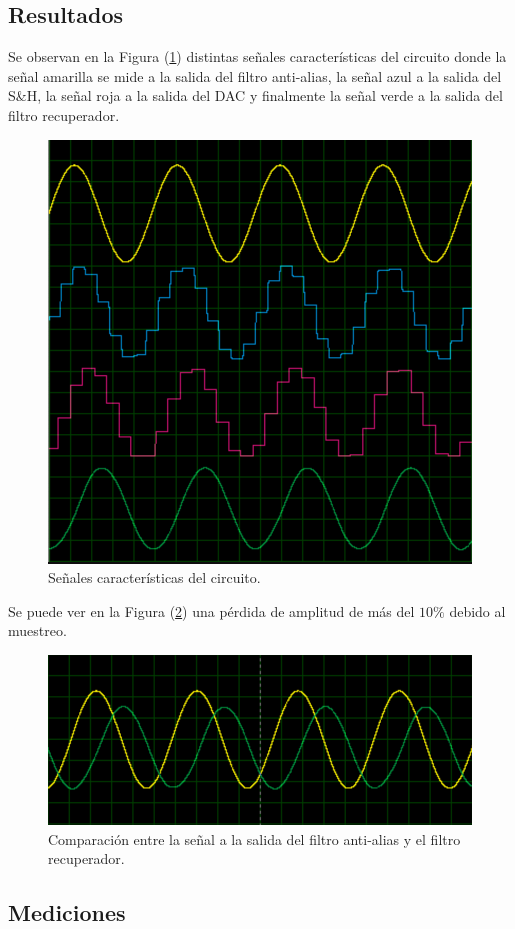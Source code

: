 \subsection{Resultados}

Se observan en la Figura (\ref{result1}) distintas señales características del circuito donde la señal amarilla se mide a la salida del filtro anti-alias, la señal azul a la salida del S\&H, la señal roja a la salida del DAC y finalmente la señal verde a la salida del filtro recuperador.

\begin{figure}[H]
\centering
\includegraphics[width=0.6\linewidth, page=1]{ImagenesEjercicio1/result1.png}
\caption{Señales características del circuito.}
\label{result1}
\end{figure}

Se puede ver en la Figura (\ref{result2}) una pérdida de amplitud de más del $10\%$ debido al muestreo.

\begin{figure}[H]
\centering
\includegraphics[width=0.8\linewidth, page=1]{ImagenesEjercicio1/result2.png}
\caption{Comparación entre la señal a la salida del filtro anti-alias y el filtro recuperador.}
\label{result2}
\end{figure}

\subsection{Mediciones}

